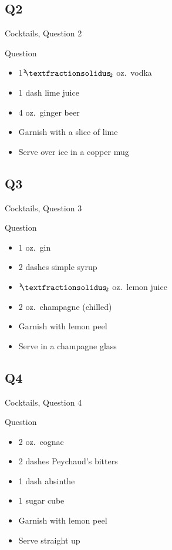 \documentclass[11pt]{beamer}
\begin{document}
\subsection*{Q2}
\begin{frame}[t]{Cocktails, Question 2}
\begin{block}{Question}
\begin{itemize}
\item 1\({}^1{\mskip -5mu⁄\mskip -3mu}_2\) oz.\ vodka
\item 1 dash lime juice
\item 4 oz.\ ginger beer
\item Garnish with a slice of lime
\item Serve over ice in a copper mug
\end{itemize}
\end{block}
\end{frame}
\subsection*{Q3}
\begin{frame}[t]{Cocktails, Question 3}
\begin{block}{Question}
\begin{itemize}
\item 1 oz.\ gin
\item 2 dashes simple syrup
\item \({}^1{\mskip -5mu⁄\mskip -3mu}_2\) oz.\ lemon juice
\item 2 oz.\ champagne (chilled)
\item Garnish with lemon peel
\item Serve in a champagne glass
\end{itemize}
\end{block}
\end{frame}
\subsection*{Q4}
\begin{frame}[t]{Cocktails, Question 4}
\begin{block}{Question}
\begin{itemize}
\item 2 oz.\ cognac
\item 2 dashes Peychaud's bitters
\item 1 dash absinthe
\item 1 sugar cube
\item Garnish with lemon peel
\item Serve straight up
\end{itemize}
\end{block}
\end{frame}
\end{document}

